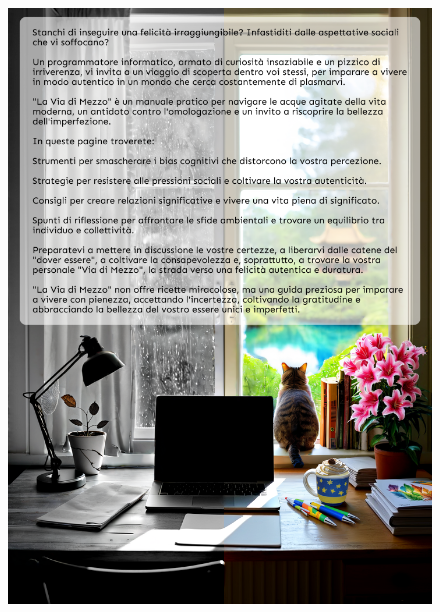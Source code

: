 \documentclass[12pt]{book} %
\begin{document}
\begin{figure}[htbp]
    \centering
    \includegraphics[width=\paperwidth,height=\paperheight]{images/cover_back.png}
    \vspace{-\baselineskip} %
\end{figure}
\end{document}
